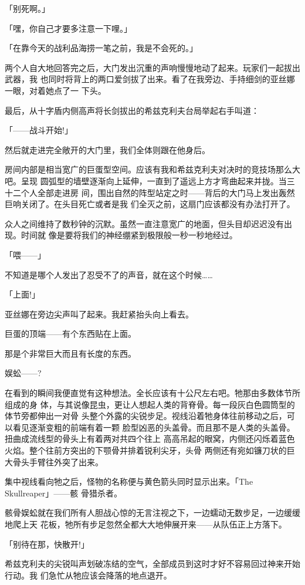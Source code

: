 \documentclass[11pt]{book}
\begin{document}
「别死啊。」

「嘿，你自己才要多注意一下哩。」

「在靠今天的战利品海捞一笔之前，我是不会死的。」

两个人自大地回答完之后，大门发出沉重的声响慢慢地动了起来。玩家们一起拔出武器，我
也同时将背上的两口爱剑拔了出来。看了在我旁边、手持细剑的亚丝娜一眼，对着她点了一
下头。

最后，从十字盾内侧高声将长剑拔出的希兹克利夫台局举起右手叫道：

「——战斗开始!」

然后就走进完全敞开的大门里，我们全体则跟在他身后。

房间内部是相当宽广的巨蛋型空间。应该有我和希兹克利夫对决时的竞技场那么大吧。呈现
圆弧型的墙壁逐渐向上延伸，一直到了遥远上方才弯曲起来并拢。当三十二个人全部走进房
间，围出自然的阵型站定之时——背后的大门马上发出轰然巨响关闭了。在头目死亡或者是我
们全灭之前，这扇门应该都没有办法打开了。

众人之间维持了数秒钟的沉默。虽然一直注意宽广的地面，但头目却迟迟没有出现。时间就
像是要将我们的神经绷紧到极限般一秒一秒地经过。

「喂——」

不知道是哪个人发出了忍受不了的声音，就在这个时候……

「上面!」

亚丝娜在旁边尖声叫了起来。我赶紧抬头向上看去。

巨蛋的顶端——有个东西贴在上面。

那是个非常巨大而且有长度的东西。

娱蚣——?

在看到的瞬间我便直觉有这种想法。全长应该有十公尺左右吧。牠那由多数体节所组成的身
体，与其说像昆虫，更让人想起人类的背脊骨。每一段灰白色圆筒型的体节旁都伸出一对骨
头整个外露的尖锐步足。视线沿着牠身体往前移动之后，可以看见逐渐变粗的前端有着一颗
脸型凶恶的头盖骨。而且那不是人类的头盖骨。扭曲成流线型的骨头上有着两对共四个往上
高高吊起的眼窝，内侧还闪烁着蓝色火焰。整个往前方突出的下颚骨并排着锐利尖牙，头骨
两侧还有宛如镰刀状的巨大骨头手臂往外突了出来。

集中视线看向牠之后，怪物的名称便与黄色箭头同时显示出来。「The Skullreaper」——骸
骨猎杀者。

骸骨娱蚣就在我们所有人胆战心惊的无言注视之下，一边蠕动无数步足，一边缓缓地爬上天
花板，牠所有步足忽然全都大大地伸展开来——从队伍正上方落下。

「别待在那，快散开!」

希兹克利夫的尖锐叫声划破冻结的空气，全部成员到这时才好不容易回过神来开始行动。我
们急忙从牠应该会降落的地点退开。
\end{document}
